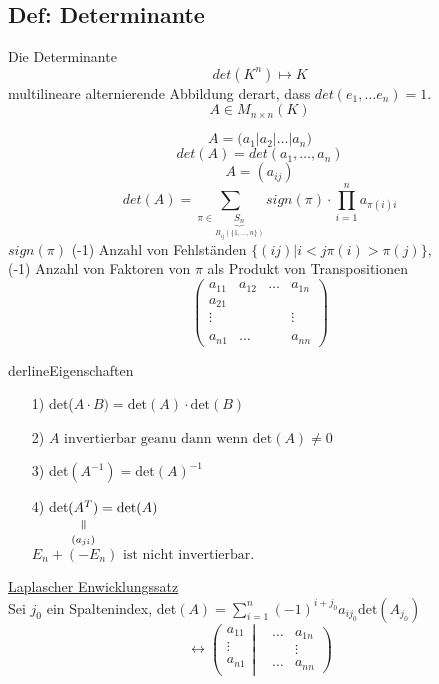 \documentclass[titlepage,12pt,a4paper,ngerman]{report}
\newcommand{\verteq}{\rotatebox{90}{$\,=$}}
\newcommand{\equalto}[2]{\underset{\scriptstyle\overset{\mkern4mu\verteq}{#2}}{#1}}
\begin{document}
\subsection{Def: Determinante} Die Determinante $$det(K^n) \mapsto K$$ multilineare alternierende Abbildung derart, dass $det(e_1,\dots e_n) = 1$.
$$A\in M_{n\times n}(K)$$

$$A  = \Bigg( a_1 \bigg\vert a_2\bigg\vert \dots \bigg\vert a_n\Bigg) $$
$$ det(A) = det(a_1,\dots , a_n)$$
$$A=(a_{ij})$$
$$det(A) = \sum_{\pi \in \underbrace{S_n}_{B_{ij}(\{1,\dots ,n\})}} sign(\pi) \cdot \prod _{i = 1}^n a_{\pi(i)i}$$
$sign(\pi)$ (-1) Anzahl von Fehlständen $\{(ij)\vert i<j \pi(i) >\pi(j)\}$, \\
(-1) Anzahl von Faktoren von $\pi$ als Produkt von Transpositionen\\


$$\begin{pmatrix}
a_{11} & a_{12} & \dots & a_{1n} \\
a_{21} &  &  &  \\
\vdots &  &  & \vdots \\
&  &  &  \\
a_{n1} & \dots &  & a_{nn} 
\end{pmatrix}$$

derline{Eigenschaften}\\
\begin{itemize}
	\item[1)] det($A \cdot B) = \textrm{det}(A) \cdot \textrm{det}(B)$
	\item[2)] $A \textrm{ invertierbar geanu dann wenn det}(A) \neq 0$
	\item[3)] det$(A^{-1}) = \textrm{det}(A)^{-1}$
	\item[4)] det$\equalto{(A^T)}{(a_{ji})} = \textrm{det} (A)$\\$E_n + (-E_n) \textrm{ ist nicht invertierbar.}$
\end{itemize}
\underline{Laplascher Enwicklungssatz}\\
Sei $j_0$ ein Spaltenindex, det$(A) = \sum_{i=1}^n (-1)^{i+j_0} a_{ij_0} \textrm{det}(A_{j_0})$\\

$$\leftrightarrow
\left(\begin{matrix}
a_{11} \\
\vdots \\
a_{n1} \\
\end{matrix}
\right| \left.
\begin{matrix}
&  \dots & a_{1n} \\
&  & \vdots \\
&  \dots & a_{nn}
\end{matrix} \right)$$
\end{document}
